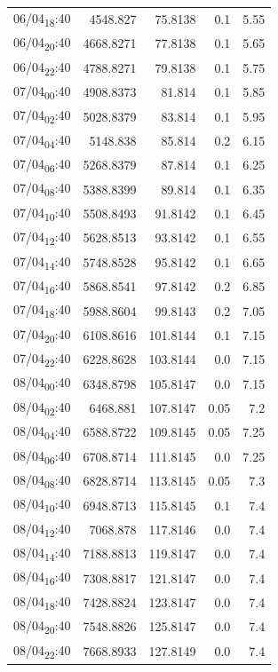 \documentclass[11pt]{article}
\begin{document}
\begin{center}
\begin{tabular}{lrrrr}
06/04\textsubscript{18}:40 & 4548.827 & 75.8138 & 0.1 & 5.55\\[0pt]
06/04\textsubscript{20}:40 & 4668.8271 & 77.8138 & 0.1 & 5.65\\[0pt]
06/04\textsubscript{22}:40 & 4788.8271 & 79.8138 & 0.1 & 5.75\\[0pt]
07/04\textsubscript{00}:40 & 4908.8373 & 81.814 & 0.1 & 5.85\\[0pt]
07/04\textsubscript{02}:40 & 5028.8379 & 83.814 & 0.1 & 5.95\\[0pt]
07/04\textsubscript{04}:40 & 5148.838 & 85.814 & 0.2 & 6.15\\[0pt]
07/04\textsubscript{06}:40 & 5268.8379 & 87.814 & 0.1 & 6.25\\[0pt]
07/04\textsubscript{08}:40 & 5388.8399 & 89.814 & 0.1 & 6.35\\[0pt]
07/04\textsubscript{10}:40 & 5508.8493 & 91.8142 & 0.1 & 6.45\\[0pt]
07/04\textsubscript{12}:40 & 5628.8513 & 93.8142 & 0.1 & 6.55\\[0pt]
07/04\textsubscript{14}:40 & 5748.8528 & 95.8142 & 0.1 & 6.65\\[0pt]
07/04\textsubscript{16}:40 & 5868.8541 & 97.8142 & 0.2 & 6.85\\[0pt]
07/04\textsubscript{18}:40 & 5988.8604 & 99.8143 & 0.2 & 7.05\\[0pt]
07/04\textsubscript{20}:40 & 6108.8616 & 101.8144 & 0.1 & 7.15\\[0pt]
07/04\textsubscript{22}:40 & 6228.8628 & 103.8144 & 0.0 & 7.15\\[0pt]
08/04\textsubscript{00}:40 & 6348.8798 & 105.8147 & 0.0 & 7.15\\[0pt]
08/04\textsubscript{02}:40 & 6468.881 & 107.8147 & 0.05 & 7.2\\[0pt]
08/04\textsubscript{04}:40 & 6588.8722 & 109.8145 & 0.05 & 7.25\\[0pt]
08/04\textsubscript{06}:40 & 6708.8714 & 111.8145 & 0.0 & 7.25\\[0pt]
08/04\textsubscript{08}:40 & 6828.8714 & 113.8145 & 0.05 & 7.3\\[0pt]
08/04\textsubscript{10}:40 & 6948.8713 & 115.8145 & 0.1 & 7.4\\[0pt]
08/04\textsubscript{12}:40 & 7068.878 & 117.8146 & 0.0 & 7.4\\[0pt]
08/04\textsubscript{14}:40 & 7188.8813 & 119.8147 & 0.0 & 7.4\\[0pt]
08/04\textsubscript{16}:40 & 7308.8817 & 121.8147 & 0.0 & 7.4\\[0pt]
08/04\textsubscript{18}:40 & 7428.8824 & 123.8147 & 0.0 & 7.4\\[0pt]
08/04\textsubscript{20}:40 & 7548.8826 & 125.8147 & 0.0 & 7.4\\[0pt]
08/04\textsubscript{22}:40 & 7668.8933 & 127.8149 & 0.0 & 7.4\\[0pt]
\end{tabular}
\end{center}
\end{document}
